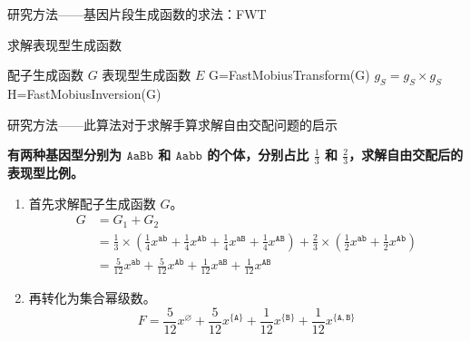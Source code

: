 \documentclass{beamer}
\begin{document}
	\begin{frame}{研究方法——基因片段生成函数的求法：FWT}
		\begin{algorithm}[H]
			\caption{求解表现型生成函数}
			\begin{algorithmic}[1]
				\Require 配子生成函数 $G$
				\Ensure 表现型生成函数 $E$
				\State G=FastMobiusTransform(G)
				\State $g_S=g_S \times g_S$
				\EndFor
				\State H=FastMobiusInversion(G)
				\State {}
				\EndFunction
			\end{algorithmic}
		\end{algorithm}
	\end{frame}

	\begin{frame}{研究方法——此算法对于求解手算求解自由交配问题的启示}
	
		\textbf{有两种基因型分别为 $\texttt{AaBb}$ 和 $\texttt{Aabb}$ 的个体，分别占比 $\frac{1}{3}$ 和 $\frac{2}{3}$，求解自由交配后的表现型比例。}
		
		\begin{enumerate}
			\item 首先求解配子生成函数 $G$。\\ 
			$$
			\begin{aligned}
				G &= G_1+G_2 \\
				&= \frac{1}{3} \times (\frac{1}{4}x^{\texttt{ab}}+\frac{1}{4}x^{\texttt{Ab}}+\frac{1}{4}x^{\texttt{aB}}+\frac{1}{4}x^{\texttt{AB}})+\frac{2}{3} \times (\frac{1}{2}x^{\texttt{ab}} + \frac{1}{2}x^{\texttt{Ab}}) \\
				&= \frac{5}{12} x^{\texttt{ab}} + \frac{5}{12} x^{\texttt{Ab}} + \frac{1}{12} x^{\texttt{aB}} + \frac{1}{12} x^{\texttt{AB}}
			\end{aligned}
			$$
			\item 再转化为集合幂级数。\\
			$$F = \frac{5}{12} x^{\varnothing} + \frac{5}{12} x^{\{\texttt{A}\}} + \frac{1}{12} x^{\{\texttt{B}\}} + \frac{1}{12} x^{\{\texttt{A},\texttt{B}\}}
			$$
		\end{enumerate}
	\end{frame}
\end{document}
